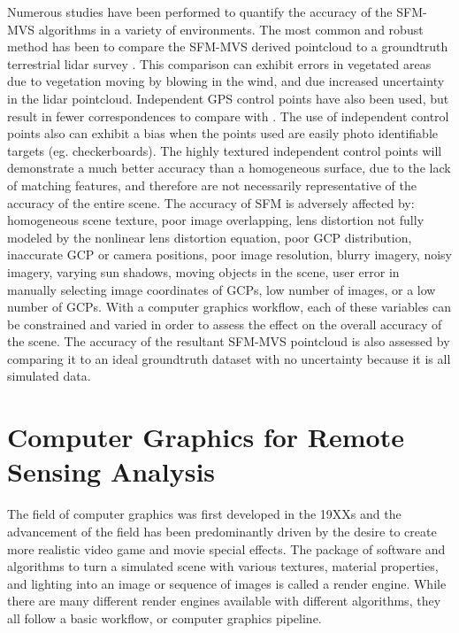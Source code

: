 Numerous studies have been performed to quantify the accuracy of the SFM-MVS algorithms in a variety of environments.  The most common and robust method has been to compare the SFM-MVS derived pointcloud to a groundtruth terrestrial lidar survey .  This comparison can exhibit errors in vegetated areas due to vegetation moving by blowing in the wind, and due increased uncertainty in the lidar pointcloud.  Independent GPS control points have also been used, but result in fewer correspondences to compare with .  The use of independent control points also can exhibit a bias when the points used are easily photo identifiable targets (eg. checkerboards).  The highly textured independent control points will demonstrate a much better accuracy than a homogeneous surface, due to the lack of matching features, and therefore are not necessarily representative of the accuracy of the entire scene.  The accuracy of SFM is adversely affected by: homogeneous scene texture, poor image overlapping, lens distortion not fully modeled by the nonlinear lens distortion equation, poor GCP distribution, inaccurate GCP or camera positions, poor image resolution, blurry imagery, noisy imagery, varying sun shadows, moving objects in the scene, user error in manually selecting image coordinates of GCPs, low number of images, or a low number of GCPs.  With a computer graphics workflow, each of these variables can be constrained and varied in order to assess the effect on the overall accuracy of the scene.  The accuracy of the resultant SFM-MVS pointcloud is also assessed by comparing it to an ideal groundtruth dataset with no uncertainty because it is all simulated data.  

\section{Computer Graphics for Remote Sensing Analysis}

The field of computer graphics was first developed in the 19XXs  and the advancement of the field has been predominantly driven by the desire to create more realistic video game and movie special effects.   The package of software and algorithms to turn a simulated scene with various textures, material properties, and lighting into an image or sequence of images is called a render engine.  While there are many different render engines available with different algorithms, they all follow a basic workflow, or computer graphics pipeline.  

